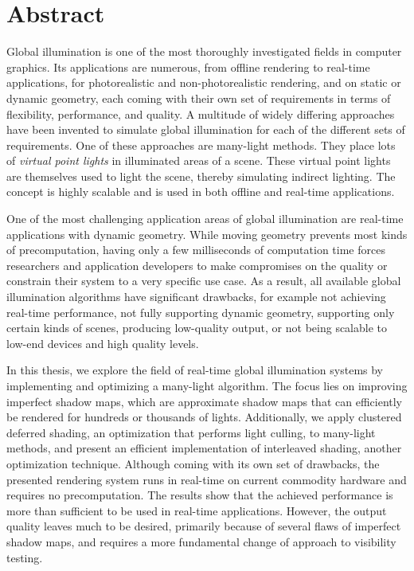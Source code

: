 
\chapter*{Abstract}

Global illumination is one of the most thoroughly investigated fields in computer graphics. Its applications are numerous, from offline rendering to real-time applications, for photorealistic and non-photorealistic rendering, and on static or dynamic geometry, each coming with their own set of requirements in terms of flexibility, performance, and quality. A multitude of widely differing approaches have been invented to simulate global illumination for each of the different sets of requirements. One of these approaches are many-light methods. They place lots of \textit{virtual point lights} in illuminated areas of a scene. These virtual point lights are themselves used to light the scene, thereby simulating indirect lighting. The concept is highly scalable and is used in both offline and real-time applications.

One of the most challenging application areas of global illumination are real-time applications with dynamic geometry. While moving geometry prevents most kinds of precomputation, having only a few milliseconds of computation time forces researchers and application developers to make compromises on the quality or constrain their system to a very specific use case. As a result, all available global illumination algorithms have significant drawbacks, for example not achieving real-time performance, not fully supporting dynamic geometry, supporting only certain kinds of scenes, producing low-quality output, or not being scalable to low-end devices and high quality levels.

In this thesis, we explore the field of real-time global illumination systems by implementing and optimizing a many-light algorithm. The focus lies on improving imperfect shadow maps, which are approximate shadow maps that can efficiently be rendered for hundreds or thousands of lights. Additionally, we apply clustered deferred shading, an optimization that performs light culling, to many-light methods, and present an efficient implementation of interleaved shading, another optimization technique. Although coming with its own set of drawbacks, the presented rendering system runs in real-time on current commodity hardware and requires no precomputation. The results show that the achieved performance is more than sufficient to be used in real-time applications. However, the output quality leaves much to be desired, primarily because of several flaws of imperfect shadow maps, and requires a more fundamental change of approach to visibility testing.

